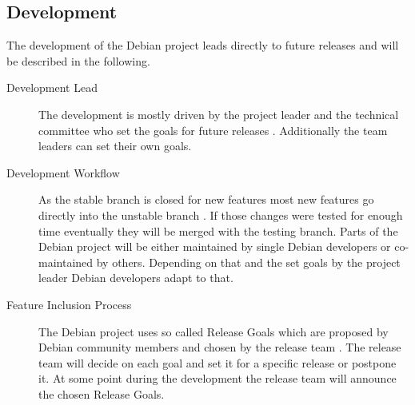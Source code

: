 \subsection{Development}

The development of the Debian project leads directly to future releases and
will be described in the following.

\begin{description}

  \item[Development Lead] The development is mostly driven by the project
    leader and the technical committee who set the goals for future releases
    \cite{DebianOrg}. Additionally the team leaders can set their own goals.

  \item[Development Workflow] As the stable branch is closed for new features
    most new features go directly into the unstable branch
    \cite{DebianFAQ,DebianDev,DebianReleaseManagement}. If those changes were
    tested for enough time eventually they will be merged with the testing
    branch. Parts of the Debian project will be either maintained by single
    Debian developers or co-maintained by others. Depending on that and the
    set goals by the project leader Debian developers adapt to that.

  \item[Feature Inclusion Process] The Debian project uses so called Release
    Goals which are proposed by Debian community members and chosen by the
    release team \cite{DebianReleaseGoals,McGovern2011}. The release team
    will decide on each goal and set it for a specific release or postpone
    it. At some point during the development the release team will announce
    the chosen Release Goals.

\end{description}


